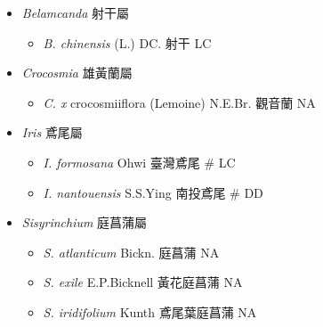 
  \begin{itemize}
 \item[] \textit{Belamcanda} 射干屬
                                
  \begin{itemize}
        \item[] \textit{B. chinensis} (L.) DC.  射干   LC
  \end{itemize}
 \item[] \textit{Crocosmia} 雄黃蘭屬
                                
  \begin{itemize}
        \item[] \textit{C. x} crocosmiiflora (Lemoine) N.E.Br.  觀音蘭   NA
  \end{itemize}
 \item[] \textit{Iris} 鳶尾屬
                                
  \begin{itemize}
        \item[] \textit{I. formosana} Ohwi  臺灣鳶尾  \# LC
        \item[] \textit{I. nantouensis} S.S.Ying  南投鳶尾  \# DD
  \end{itemize}
 \item[] \textit{Sisyrinchium} 庭菖蒲屬
                                
  \begin{itemize}
        \item[] \textit{S. atlanticum} Bickn.  庭菖蒲   NA
        \item[] \textit{S. exile} E.P.Bicknell  黃花庭菖蒲   NA
        \item[] \textit{S. iridifolium} Kunth  鳶尾葉庭菖蒲   NA
  \end{itemize}
  \end{itemize}
